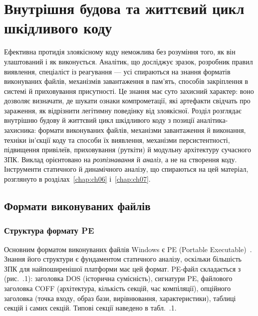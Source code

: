 \chapter{Внутрішня будова та життєвий цикл шкідливого коду}
\label{chap:ch05}

Ефективна протидія злоякісному коду неможлива без розуміння того, як він улаштований і як виконується. Аналітик, що досліджує зразок, розробник правил виявлення, спеціаліст із реагування --- усі спираються на знання форматів виконуваних файлів, механізмів завантаження в пам'ять, способів закріплення в системі й приховування присутності. Це знання має суто захисний характер: воно дозволяє визначати, де шукати ознаки компрометації, які артефакти свідчать про зараження, як відрізнити легітимну поведінку від злоякісної. Розділ розглядає внутрішню будову й життєвий цикл шкідливого коду з позиції аналітика-захисника: формати виконуваних файлів, механізми завантаження й виконання, техніки ін'єкції коду та способи їх виявлення, механізми персистентності, підвищення привілеїв, приховування (руткіти) й модульну архітектуру сучасного ЗПК. Виклад орієнтовано на \emph{розпізнавання} й \emph{аналіз}, а не на створення коду. Інструменти статичного й динамічного аналізу, що спираються на цей матеріал, розглянуто в розділах~\ref{chap:ch06} і~\ref{chap:ch07}.

\section{Формати виконуваних файлів}\label{sec:ch05-formats}

\subsection{Структура формату PE}

Основним форматом виконуваних файлів Windows є PE (Portable Executable)~\cite{ch05:pecoff}. Знання його структури є фундаментом статичного аналізу, оскільки більшість ЗПК для найпоширенішої платформи має цей формат. PE-файл складається з (рис.~\thechapter.1): заголовка DOS (історична сумісність), сигнатури PE, файлового заголовка COFF (архітектура, кількість секцій, час компіляції), опційного заголовка (точка входу, образ бази, вирівнювання, характеристики), таблиці секцій і самих секцій. Типові секції наведено в табл.~\thechapter.1.



